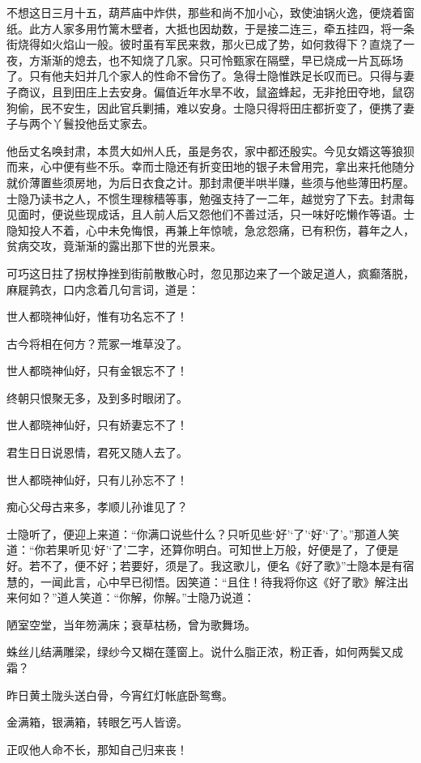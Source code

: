 不想这日三月十五，葫芦庙中炸供，那些和尚不加小心，致使油锅火逸，便烧着窗纸。此方人家多用竹篱木壁者，大抵也因劫数，于是接二连三，牵五挂四，将一条街烧得如火焰山一般。彼时虽有军民来救，那火已成了势，如何救得下？直烧了一夜，方渐渐的熄去，也不知烧了几家。只可怜甄家在隔壁，早已烧成一片瓦砾场了。只有他夫妇并几个家人的性命不曾伤了。急得士隐惟跌足长叹而已。只得与妻子商议，且到田庄上去安身。偏值近年水旱不收，鼠盗蜂起，无非抢田夺地，鼠窃狗偷，民不安生，因此官兵剿捕，难以安身。士隐只得将田庄都折变了，便携了妻子与两个丫鬟投他岳丈家去。

他岳丈名唤封肃，本贯大如州人氏，虽是务农，家中都还殷实。今见女婿这等狼狈而来，心中便有些不乐。幸而士隐还有折变田地的银子未曾用完，拿出来托他随分就价薄置些须房地，为后日衣食之计。那封肃便半哄半赚，些须与他些薄田朽屋。士隐乃读书之人，不惯生理稼穑等事，勉强支持了一二年，越觉穷了下去。封肃每见面时，便说些现成话，且人前人后又怨他们不善过活，只一味好吃懒作等语。士隐知投人不着，心中未免悔恨，再兼上年惊唬，急忿怨痛，已有积伤，暮年之人，贫病交攻，竟渐渐的露出那下世的光景来。

可巧这日拄了拐杖挣挫到街前散散心时，忽见那边来了一个跛足道人，疯癫落脱，麻屣鹑衣，口内念着几句言词，道是：

世人都晓神仙好，惟有功名忘不了！

古今将相在何方？荒冢一堆草没了。

世人都晓神仙好，只有金银忘不了！

终朝只恨聚无多，及到多时眼闭了。

世人都晓神仙好，只有娇妻忘不了！

君生日日说恩情，君死又随人去了。

世人都晓神仙好，只有儿孙忘不了！

痴心父母古来多，孝顺儿孙谁见了？

士隐听了，便迎上来道：“你满口说些什么？只听见些‘好’‘了’‘好’‘了’。”那道人笑道：“你若果听见‘好’‘了’二字，还算你明白。可知世上万般，好便是了，了便是好。若不了，便不好；若要好，须是了。我这歌儿，便名《好了歌》”士隐本是有宿慧的，一闻此言，心中早已彻悟。因笑道：“且住！待我将你这《好了歌》解注出来何如？”道人笑道：“你解，你解。”士隐乃说道：

陋室空堂，当年笏满床；衰草枯杨，曾为歌舞场。

蛛丝儿结满雕梁，绿纱今又糊在蓬窗上。说什么脂正浓，粉正香，如何两鬓又成霜？

昨日黄土陇头送白骨，今宵红灯帐底卧鸳鸯。

金满箱，银满箱，转眼乞丐人皆谤。

正叹他人命不长，那知自己归来丧！

